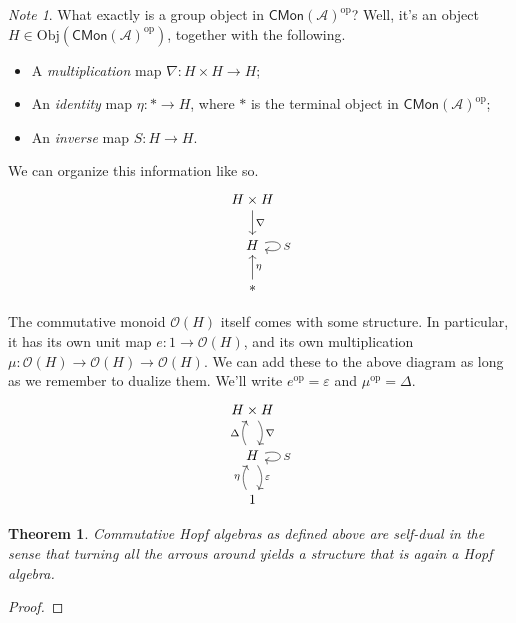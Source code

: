 \documentclass[a4paper,10pt]{scrreprt}
\newcommand{\Obj}{\mathrm{Obj}}
\theoremstyle{definition}
\theoremstyle{plain}
\newtheorem{theorem}{Theorem}[section]
\theoremstyle{remark}
\newtheorem{note}{Note}[section]
\begin{document}
\begin{note}
  What exactly is a group object in $\mathsf{CMon}(\mathscr{A})^{\text{op}}$? Well, it's an object $H \in \Obj(\mathsf{CMon}(\mathscr{A})^{\text{op}})$, together with the following.
  \begin{itemize}
    \item A \emph{multiplication} map $\nabla\colon H \times H \to H$;
    \item An \emph{identity} map $\eta\colon * \to H$, where $*$ is the terminal object in $\mathsf{CMon}(\mathscr{A})^{\mathrm{op}}$;
    \item An \emph{inverse} map $S\colon H \to H$.
  \end{itemize}
  We can organize this information like so.
  \begin{equation*}
    \begin{tikzcd}
      H \times H
      \arrow[d, "\nabla"]
      \\
      H 
      \arrow[loop right, "S"]
      \\
      *
      \arrow[u, swap, "\eta"]
    \end{tikzcd}
  \end{equation*}

  The commutative monoid $\mathscr{O}(H)$ itself comes with some structure. In particular, it has its own unit map $e\colon 1 \to \mathscr{O}(H)$, and its own multiplication $\mu\colon \mathscr{O}(H) \to \mathscr{O}(H) \to \mathscr{O}(H)$. We can add these to the above diagram as long as we remember to dualize them. We'll write $e^{\mathrm{op}} = \varepsilon$ and $\mu^{\mathrm{op}} = \Delta$.
  \begin{equation*}
    \begin{tikzcd}
      H \times H
      \arrow[d, bend left, "\nabla"]
      \\
      H 
      \arrow[u, bend left, "\Delta"]
      \arrow[loop right, "S"]
      \arrow[d, bend left, "\varepsilon"]
      \\
      1
      \arrow[u, bend left, "\eta"]
    \end{tikzcd}
  \end{equation*}
\end{note}

\begin{theorem}
  Commutative Hopf algebras as defined above are \emph{self-dual} in the sense that turning all the arrows around yields a structure that is again a Hopf algebra.
\end{theorem}
\begin{proof}
  
\end{proof}
\end{document}

